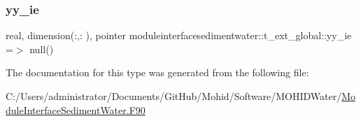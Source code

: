 \mbox{\label{structmoduleinterfacesedimentwater_1_1t__ext__global_a15d86d5ef5e68403930e29b552bf9cbf}} 
\subsubsection{\texorpdfstring{yy\+\_\+ie}{yy\_ie}}
{\footnotesize\ttfamily real, dimension(\+:,\+:  ), pointer moduleinterfacesedimentwater\+::t\+\_\+ext\+\_\+global\+::yy\+\_\+ie =$>$ null()\hspace{0.3cm}{\ttfamily [private]}}



The documentation for this type was generated from the following file\+:\begin{DoxyCompactItemize}
\item 
C\+:/\+Users/administrator/\+Documents/\+Git\+Hub/\+Mohid/\+Software/\+M\+O\+H\+I\+D\+Water/\mbox{\hyperlink{_module_interface_sediment_water_8_f90}{Module\+Interface\+Sediment\+Water.\+F90}}\end{DoxyCompactItemize}
